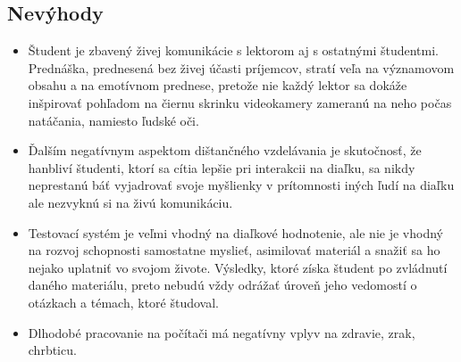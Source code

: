 \documentclass[10pt,oneside,slovak,a4paper]{article}
\begin{document}
\subsection{Nevýhody}
\begin{itemize}
	\item Študent je zbavený živej komunikácie s lektorom aj s ostatnými študentmi.
	Prednáška, prednesená bez živej účasti príjemcov, stratí veľa na významovom obsahu a na emotívnom prednese, pretože nie každý lektor sa dokáže inšpirovať pohľadom na čiernu skrinku videokamery zameranú na neho počas natáčania, namiesto ľudské oči.\cite{Sokolova2018}
	\item Ďalším negatívnym aspektom dištančného vzdelávania je skutočnosť, že hanbliví študenti, ktorí sa cítia lepšie pri interakcii na diaľku, sa nikdy neprestanú báť vyjadrovať svoje myšlienky v prítomnosti iných ľudí na diaľku ale nezvyknú si na živú komunikáciu.\cite{Sokolova2018}
	\item Testovací systém je veľmi vhodný na diaľkové hodnotenie, ale nie je vhodný na rozvoj schopnosti samostatne myslieť, asimilovať materiál a snažiť sa ho nejako uplatniť vo svojom živote.
	Výsledky, ktoré získa študent po zvládnutí daného materiálu, preto nebudú vždy odrážať úroveň jeho vedomostí o otázkach a témach, ktoré študoval.\cite{Sokolova2018}
	\item Dlhodobé pracovanie na počítači má negatívny vplyv na zdravie, zrak, chrbticu.\cite{Sokolova2018}
\end{itemize}











\end{document}
